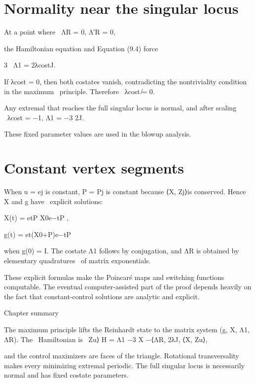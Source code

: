 \section{Normality near the singular locus}

\begin{displaytext}
At a point where \
ΛR = 0, Λ′R = 0,
\end{displaytext}

the Hamiltonian equation and Equation (9.4) force


\begin{displaytext}
3 \
Λ1 = 2λcostJ.
\end{displaytext}

\begin{displaytext}
If λcost = 0, then both costates vanish, contradicting the nontriviality condition in the maximum \
principle. Therefore \
λcost ̸= 0.
\end{displaytext}

\begin{displaytext}
Any extremal that reaches the full singular locus is normal, and after scaling \
λcost = −1, Λ1 = −3 2J.
\end{displaytext}

These fixed parameter values are used in the blowup analysis.


\section{Constant vertex segments}

\begin{displaytext}
When u = ej is constant, P = Pj is constant because ⟨X, Zj⟩is conserved. Hence X and g have \
explicit solutions:
\end{displaytext}

X(t) = etP X0e−tP ,


g(t) = et(X0+P)e−tP


\begin{displaytext}
when g(0) = I. The costate Λ1 follows by conjugation, and ΛR is obtained by elementary quadratures \
of matrix exponentials.
\end{displaytext}

These explicit formulas make the Poincaré maps and switching functions computable. The eventual computer-assisted part of the proof depends heavily on the fact that constant-control solutions are analytic and explicit.


\begin{insightbox}{Chapter summary}
\end{insightbox}

\begin{displaytext}
The maximum principle lifts the Reinhardt state to the matrix system (g, X, Λ1, ΛR). The \
Hamiltonian is \
Zu⟩ H = Λ1 −3 X −⟨ΛR, 2λJ, ⟨X, Zu⟩,
\end{displaytext}

and the control maximizers are faces of the triangle. Rotational transversality makes every minimizing extremal periodic. The full singular locus is necessarily normal and has fixed costate parameters.

